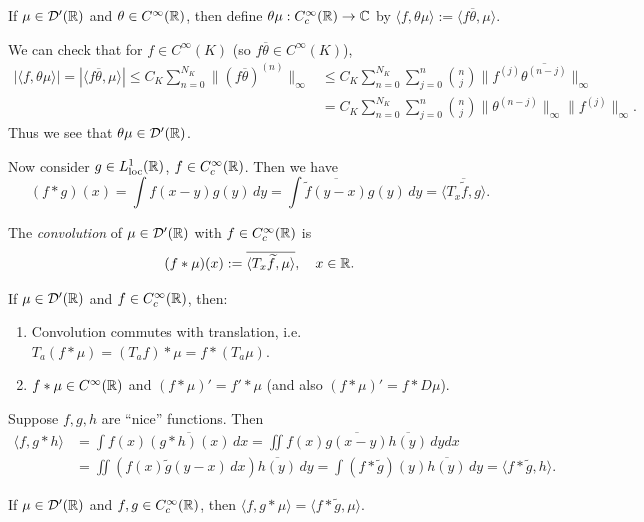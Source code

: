 \begin{definition}
  If $\mu \in \mathcal{D}'(\mathbb{R})$
  and $\theta \in C^\infty(\mathbb{R})$,
  then define $\theta \mu : C^\infty_c(\mathbb{R}) \to \mathbb{C}$ by
  $\langle f, \theta \mu \rangle
    := \langle f \overline{\theta}, \mu \rangle$.
\end{definition}

\begin{remark}
  We can check that for $f \in C^\infty(K)$
  (so $f \overline{\theta} \in C^\infty(K)$),
  \begin{align*}
    |\langle f, \theta \mu \rangle|
    = |\langle f \overline{\theta}, \mu \rangle|
    \le C_K \sum_{n = 0}^{N_K}
    \|(f \overline{\theta})^{(n)}\|_\infty
    &\le C_K \sum_{n = 0}^{N_K}
    \sum_{j = 0}^n \binom{n}{j} \|f^{(j)} \overline{\theta^{(n - j)}}\|_\infty \\
    &= C_K \sum_{n = 0}^{N_K} \sum_{j = 0}^n \binom{n}{j} \|\theta^{(n - j)}\|_\infty \|f^{(j)}\|_\infty.
  \end{align*}
  Thus we see that
  $\theta \mu \in \mathcal{D}'(\mathbb{R})$.
\end{remark}

\begin{remark}
  Now consider $g \in L^1_{\mathrm{loc}}(\mathbb{R})$,
  $f \in C^\infty_c(\mathbb{R})$. Then we have
  \[
    (f * g)(x)
    = \int f(x - y) g(y) \, dy
    = \int \overline{\widetilde{f}(y - x)} g(y) \, dy
    = \overline{\langle T_x \widetilde{f}, g \rangle}.
  \]
\end{remark}

\begin{definition}
  The \emph{convolution} of
  $\mu \in \mathcal{D}'(\mathbb{R})$
  with $f \in C^\infty_c(\mathbb{R})$ is
  \[
    (f * \mu)(x)
    := \overline{\langle T_x \widetilde{f}, \mu \rangle}, \quad
    x \in \mathbb{R}.
  \]
\end{definition}

\begin{theorem}
  If $\mu \in \mathcal{D}'(\mathbb{R})$
  and $f \in C^\infty_c(\mathbb{R})$,
  then:
  \begin{enumerate}
    \item Convolution commutes with
      translation, i.e.
      $T_a(f * \mu) = (T_a f) * \mu = f * (T_a \mu)$.
    \item $f * \mu \in C^\infty(\mathbb{R})$
      and $(f * \mu)' = f' * \mu$
      (and also $(f * \mu)' = f * D\mu$).
  \end{enumerate}
\end{theorem}

\begin{remark}
  Suppose $f, g, h$ are ``nice'' functions.
  Then
  \begin{align*}
    \langle f, g * h \rangle
    &= \int f(x) \overline{(g * h)(x)}\, dx
    = \iint f(x) \overline{g(x - y)} \overline{h(y)}\, dy dx \\
    &= \iint \left(f(x) \widetilde{g}(y - x) \, dx\right)
    \overline{h(y)}\, dy
    = \int (f * \widetilde{g})(y) \overline{h(y)}\, dy
    = \langle f * \widetilde{g}, h \rangle.
  \end{align*}
\end{remark}

\begin{theorem}
  If $\mu \in \mathcal{D}'(\mathbb{R})$
  and $f, g \in C^\infty_c(\mathbb{R})$, then
  $\langle f, g * \mu \rangle
    = \langle f * \widetilde{g}, \mu \rangle$.
\end{theorem}
